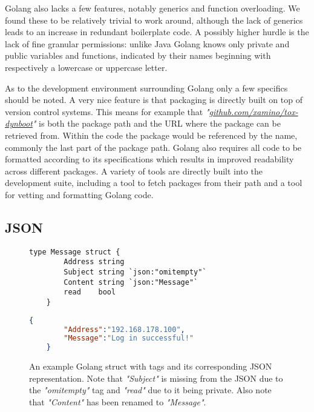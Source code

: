 Golang also lacks a few features, notably generics and function overloading.
We found these to be relatively trivial to work around, although the lack of generics leads to an increase in redundant boilerplate code.
A possibly higher hurdle is the lack of fine granular permissions: unlike Java Golang knows only private and public variables and functions, indicated by their names beginning with respectively a lowercase or uppercase letter.

As to the development environment surrounding Golang only a few specifics should be noted.
A very nice feature is that packaging is directly built on top of version control systems.
This means for example that \textit{"\href{https://github.com/xamino/tox-dynboot}{github.com/xamino/tox-dynboot}"} is both the package path and the URL where the package can be retrieved from.
Within the code the package would be referenced by the name, commonly the last part of the package path.
Golang also requires all code to be formatted according to its specifications which results in improved readability across different packages.
A variety of tools are directly built into the development suite, including a tool to fetch packages from their path and a tool for vetting and formatting Golang code.

\subsection{JSON}
\label{sub:JSON}

\begin{figure}[htp]
    \begin{lstlisting}[language=golang,firstnumber=0]
    type Message struct {
        Address string
        Subject string `json:"omitempty"`
        Content string `json:"Message"`
        read    bool
    }
    \end{lstlisting}
    \begin{lstlisting}[language=json,firstnumber=0]
    {
        "Address":"192.168.178.100",
        "Message":"Log in successful!"
    }
    \end{lstlisting}
\caption[Golang JSON Example]{
    An example Golang struct with tags and its corresponding JSON representation.
    Note that \textit{"Subject"} is missing from the JSON due to the \textit{"omitempty"} tag and \textit{"read"} due to it being private.
    Also note that \textit{"Content"} has been renamed to \textit{"Message"}.
}
\label{golang:json_example}
\end{figure}

